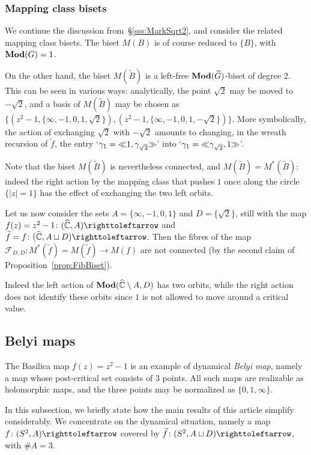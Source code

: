 \documentclass{amsart}
\newcommand\Forget{{\mathcal F}}
\newcommand\wtf{{\widetilde f}}
\newcommand\wtB{{\widetilde B}}
\newcommand\wtG{{\widetilde G}}
\begin{document}
\subsubsection{Mapping class bisets}
We continue the discussion from~\S\ref{sss:MarkSqrt2}, and consider
the related mapping class bisets. The biset $M(B)$ is of course
reduced to $\{B\}$, with $\mathbf{\relax Mod}(G)=1$.

On the other hand, the biset $M(\wtB)$ is a left-free
$\Mod(\wtG)$-biset of degree $2$. This can be seen in various
ways: analytically, the point $\sqrt2$ may be moved to $-\sqrt2$, and
a basis of $M(\wtB)$ may be chosen as
$\{(z^2-1,\{\infty,-1,0,1,\sqrt2\}),(z^2-1,\{\infty,-1,0,1,-\sqrt2\})\}$. More
symbolically, the action of exchanging $\sqrt2$ with $-\sqrt2$ amounts
to changing, in the wreath recursion of $\wtf$, the entry
`$\gamma_1={\ll}1,\gamma_{\sqrt2}{\gg}$' into
`$\gamma_1={\ll}\gamma_{\sqrt2},1{\gg}$'.

Note that the biset $M(\wtB)$ is nevertheless connected, and
$M(\wtB)=M^*(\wtB)$: indeed the right action by the
mapping class that pushes $1$ once along the circle $\{|z|=1\}$ has
the effect of exchanging the two left orbits.

\begin{exple}\label{ex:notexact}
  Let us now consider the sets $A=\{\infty,-1,0,1\}$ and
  $D=\{\sqrt2\}$, still with the map
  $f(z)=z^2-1\colon(\widehat\C,A)\selfmap$ and
  $\wtf=f\colon(\widehat\C,A\sqcup D)\selfmap$. Then the fibres of the
  map $\Forget_{D,D}\colon M^*(\wtf)=M(\wtf)\to M(f)$ are not
  connected (by the second claim of Proposition~\ref{prop:FibBiset}).

  Indeed the left action of $\mathbf{\relax Mod}(\widehat{{\mathbb C}}\setminus A,D)$ has two
  orbits, while the right action does not identify these orbits since
  $1$ is not allowed to move around a critical value.
\end{exple}

\subsection{Belyi maps}
The Basilica map $f(z)=z^2-1$ is an example of dynamical \emph{Belyi
  map}, namely a map whose post-critical set consists of $3$
points. All such maps are realizable as holomorphic maps, and the
three points may be normalized as $\{0,1,\infty\}$.

In this subsection, we briefly state how the main results of this
article simplify considerably. We concentrate on the dynamical
situation, namely a map $f\colon(S^2,A)\selfmap$ covered by
$\wtf\colon(S^2,A\sqcup D)\selfmap$, with $\#A=3$.
\end{document}
